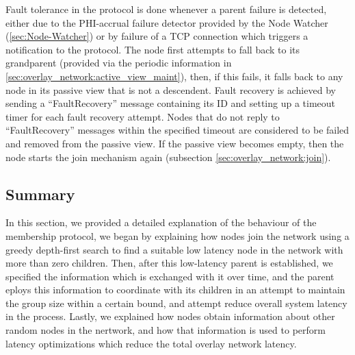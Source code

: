 Fault tolerance in the protocol is done whenever a parent failure is detected, either due to the PHI-accrual failure detector provided by the Node Watcher (\ref{sec:Node-Watcher}) or by failure of a TCP connection which triggers a notification to the protocol. The node first attempts to fall back to its grandparent (provided via the periodic information in \ref{sec:overlay_network:active_view_maint}), then, if this fails, it falls back to any node in its passive view that is not a descendent. Fault recovery is achieved by sending a ``FaultRecovery'' message containing its ID and setting up a timeout timer for each fault recovery attempt. Nodes that do not reply to ``FaultRecovery'' messages within the specified timeout are considered to be failed and removed from the passive view. If the passive view becomes empty, then the node starts the join mechanism again (subsection \ref{sec:overlay_network:join}).

\subsection{Summary}

In this section, we provided a detailed explanation of the behaviour of the membership protocol, we began by explaining how nodes join the network using a greedy depth-first search to find a suitable low latency node in the network with more than zero children. Then, after this low-latency parent is established, we specified the information which is exchanged with it over time, and the parent eploys this information to coordinate with its children in an attempt to maintain the group size within a certain bound, and attempt reduce overall system latency in the process. Lastly, we explained how nodes obtain information about other random nodes in the nertwork, and how that information is used to perform latency optimizations which reduce the total overlay network latency.
